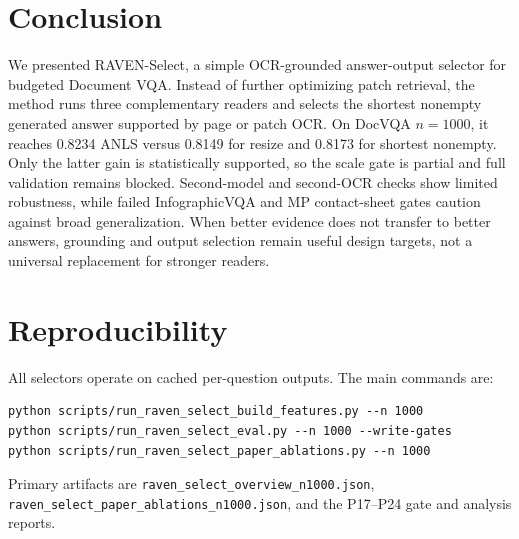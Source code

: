 \documentclass[journal]{IEEEtran}
\begin{document}
\section{Conclusion}
We presented RAVEN-Select, a simple OCR-grounded answer-output selector for
budgeted Document VQA.  Instead of further optimizing patch retrieval, the
method runs three complementary readers and selects the shortest nonempty
generated answer supported by page or patch OCR.  On DocVQA $n=1000$, it
reaches 0.8234 ANLS versus 0.8149 for resize and 0.8173 for shortest nonempty.
Only the latter gain is statistically supported, so the scale gate is partial
and full validation remains blocked.  Second-model and second-OCR checks show
limited robustness, while failed InfographicVQA and MP contact-sheet gates
caution against broad generalization.  When better evidence does not transfer
to better answers, grounding and output selection remain useful design targets,
not a universal replacement for stronger readers.

\section*{Reproducibility}
All selectors operate on cached per-question outputs.  The main commands are:
\begin{verbatim}
python scripts/run_raven_select_build_features.py --n 1000
python scripts/run_raven_select_eval.py --n 1000 --write-gates
python scripts/run_raven_select_paper_ablations.py --n 1000
\end{verbatim}
Primary artifacts are
\texttt{raven\_select\_overview\_n1000.json},
\texttt{raven\_select\_paper\_ablations\_n1000.json}, and the P17--P24 gate
and analysis reports.



\end{document}
